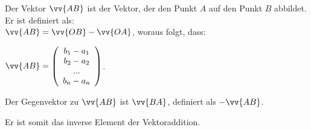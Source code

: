       \begin{Definition}
        Der Vektor $\vv{AB}$ ist der Vektor, der den Punkt $A$ auf den Punkt $B$ abbildet. Er ist definiert als:\\ $\vv{AB}=\vv{OB}-\vv{OA}$,
        woraus folgt, dass: \begin{center} $\vv{AB} = \left(\begin{array}{c} b_1 - a_1 \\ b_2 - a_2 \\ ... \\ b_n - a_n \end{array}\right)$. \end{center}
      \end{Definition}

      \begin{Definition}
        Der Gegenvektor zu $\vv{AB}$ ist $\vv{BA}$, definiert als  $-\vv{AB}$.\\

      \end{Definition}

      \begin{Bemerkung}
        Er ist somit das inverse Element der Vektoraddition.
      \end{Bemerkung}

